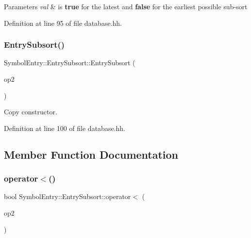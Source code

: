 \begin{DoxyParams}{Parameters}
{\em val} & is {\bfseries{true}} for the latest and {\bfseries{false}} for the earliest possible sub-\/sort \\
\hline
\end{DoxyParams}


Definition at line 95 of file database.\+hh.

\mbox{\label{class_symbol_entry_1_1_entry_subsort_a887b5a3c21dadb45e2e85f83cd827e28}} 
\subsubsection{\texorpdfstring{EntrySubsort()}{EntrySubsort()}\hspace{0.1cm}{\footnotesize\ttfamily [4/4]}}
{\footnotesize\ttfamily Symbol\+Entry\+::\+Entry\+Subsort\+::\+Entry\+Subsort (\begin{DoxyParamCaption}\item[{const \mbox{\hyperlink{class_symbol_entry_1_1_entry_subsort}{Entry\+Subsort}} \&}]{op2 }\end{DoxyParamCaption})\hspace{0.3cm}{\ttfamily [inline]}}



Copy constructor. 



Definition at line 100 of file database.\+hh.



\subsection{Member Function Documentation}
\mbox{\label{class_symbol_entry_1_1_entry_subsort_ab741d5e84221244d593cd57e651ca0a7}} 
\subsubsection{\texorpdfstring{operator$<$()}{operator<()}}
{\footnotesize\ttfamily bool Symbol\+Entry\+::\+Entry\+Subsort\+::operator$<$ (\begin{DoxyParamCaption}\item[{const \mbox{\hyperlink{class_symbol_entry_1_1_entry_subsort}{Entry\+Subsort}} \&}]{op2 }\end{DoxyParamCaption})\hspace{0.3cm}{\ttfamily [inline]}}



